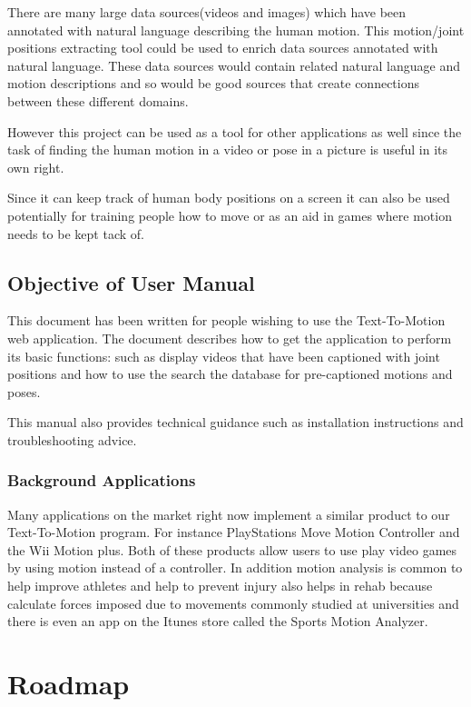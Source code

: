 \documentclass{scrreprt}
\begin{document}
There are many large data sources(videos and images) which have been annotated
with natural language describing the human motion. This motion/joint positions
extracting tool could be used to enrich data sources annotated with natural
language.  These data sources would contain related natural language  and
motion descriptions and so would be good sources that create connections
between these different domains.

However this project can be used as a tool for other applications as well since
the task of finding the human motion in a video or pose in a picture is useful
in its own right.

Since it can keep track of human body positions on a screen it can also be used
potentially for training people how to move or as an aid in games where motion
needs to be kept tack of.

\subsection{Objective of User Manual}

This document has been written for people wishing to use the Text-To-Motion web
application.  The document describes how to get the application to perform its
basic functions: such as display videos that have been captioned with joint
positions and how to use the search the database for pre-captioned motions and
poses.

This manual also provides technical guidance such as installation instructions
and troubleshooting advice.

\subsubsection{Background Applications}

Many applications on the market right now implement a similar product to our
Text-To-Motion program.  For instance PlayStations Move Motion Controller and
the Wii Motion plus.  Both of these products allow users to use play video
games by using motion instead of a controller.  In addition motion analysis is
common to help improve athletes and help to prevent injury also helps in rehab
because calculate forces imposed due to movements commonly studied at
universities and there is even an app on the Itunes store called the Sports
Motion Analyzer.

\section{Roadmap}
\end{document}
